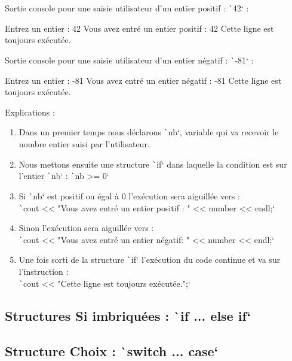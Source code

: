 \documentclass[10pt]{article}
\begin{document}
\bigskip
Sortie console pour une saisie utilisateur d'un entier positif : \texttt`42`  :

\begin{textcode}
    Entrez un entier : 42
    Vous avez entré un entier positif : 42
    Cette ligne est toujours exécutée.
\end{textcode}

Sortie console pour une saisie utilisateur d'un entier négatif : \texttt`-81`  :

\begin{textcode}
    Entrez un entier : -81
    Vous avez entré un entier négatif : -81
    Cette ligne est toujours exécutée.
\end{textcode}

Explications :

\begin{enumerate}
    \item Dans un premier temps nous déclarons \texttt`nb`, variable qui va recevoir le nombre entier saisi par l'utilisateur.
    \item Nous mettons ensuite une structure \texttt`if` dans laquelle la condition est sur l'entier \texttt`nb` : \texttt`nb >= 0` 
    \item Si \texttt`nb` est positif ou égal à 0 l'exécution sera aiguillée vers :\\
     \texttt`cout << "Vous avez entré un entier positif : " << number << endl;`
    \item Sinon l'exécution sera aiguillée vers : \\
    \texttt`cout << "Vous avez entré un entier négatif: " << number << endl;` 
    \item Une fois sorti de la structure \texttt`if` l'exécution du code continue et va sur l'instruction :\\
     \texttt`cout << "Cette ligne est toujours exécutée.";` 
\end{enumerate}

\subsection{Structures Si imbriquées : \texttt`if ... else if`}


\subsection{Structure Choix : \texttt`switch ... case`}
\end{document}
